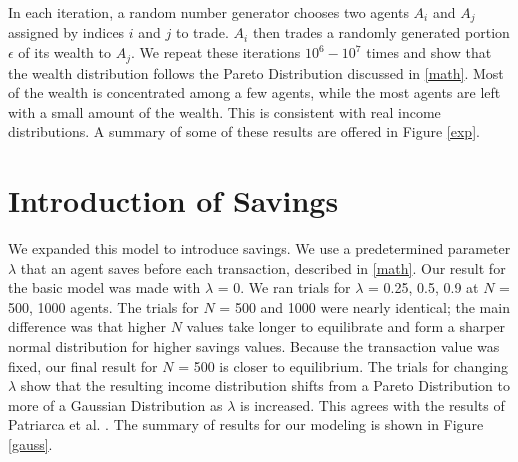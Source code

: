 \documentclass[11pt]{article}
\begin{document}
	In each iteration, a random number generator chooses two agents $A_{i}$ and $A_{j}$ assigned by indices $i$ and $j$ to trade. $A_{i}$ then trades a randomly generated portion $\epsilon$ of its wealth to $A_{j}$. We repeat these iterations $10^{6}-10^{7}$ times and show that the wealth distribution follows the Pareto Distribution discussed in \ref{math}. Most of the wealth is concentrated among a few agents, while the most agents are left with a small amount of the wealth. This is consistent with real income distributions. A summary of some of these results are offered in Figure \ref{exp}.
	
	
	
	\section{Introduction of Savings}
	
	We expanded this model to introduce savings. We use a predetermined parameter $\lambda$ that an agent saves before each transaction, described in \ref{math}. Our result for the basic model was made with $\lambda$ = 0. We ran trials for $\lambda$ = 0.25, 0.5, 0.9 at $N$ = 500, 1000 agents. The trials for $N$ = 500 and 1000 were nearly identical; the main difference was that higher $N$ values take longer to equilibrate and form a sharper normal distribution for higher savings values. Because the transaction value was fixed, our final result for $N$ = 500 is closer to equilibrium. The trials for changing $\lambda$ show that the resulting income distribution shifts from a Pareto Distribution to more of a Gaussian Distribution as $\lambda$ is increased. This agrees with the results of Patriarca et al. \cite{patriarca}. The summary of results for our modeling is shown in Figure \ref{gauss}.
	
\end{document}
